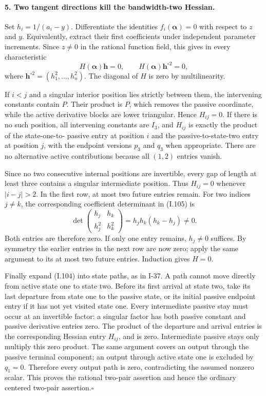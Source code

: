 \paragraph{5. Two tangent directions kill the bandwidth-two Hessian.}
Set $h_i=1/(a_i-y)$. Differentiate the identities
$f_i(\boldsymbol\alpha)=0$ with respect to $z$ and $y$.
Equivalently, extract their first coefficients under independent
parameter increments. Since $z\ne0$ in the rational function
field, this gives in every characteristic
\[
 H(\boldsymbol\alpha)\mathbf h=0,
 \qquad H(\boldsymbol\alpha)\mathbf h^{\circ2}=0,
 \tag{I.105}
\]
where $\mathbf h^{\circ2}=(h_1^2,\ldots,h_n^2)$. The diagonal
of $H$ is zero by multilinearity.

If $i<j$ and a singular interior position lies strictly between
them, the intervening constants contain $P$. Their product
is $P$, which removes the passive coordinate, while the active
derivative blocks are lower triangular. Hence $H_{ij}=0$.
If there is no such position, all intervening constants are
$I_3$, and $H_{ij}$ is exactly the product of the state-one-to-
passive entry at position $i$ and the passive-to-state-two
entry at position $j$, with the endpoint versions $p_3$ and
$q_3$ when appropriate. There are no alternative active
contributions because all $(1,2)$ entries vanish.

Since no two consecutive internal positions are invertible,
every gap of length at least three contains a singular
intermediate position. Thus $H_{ij}=0$ whenever $|i-j|>2$.
In the first row, at most two future entries remain. For two
indices $j\ne k$, the corresponding coefficient determinant
in (I.105) is
\[
 \det\begin{pmatrix}h_j&h_k\\h_j^2&h_k^2\end{pmatrix}
 =h_jh_k(h_k-h_j)\ne0.
 \tag{I.106}
\]
Both entries are therefore zero. If only one entry remains,
$h_j\ne0$ suffices. By symmetry the earlier entries in the
next row are now zero; apply the same argument to its at most
two future entries. Induction gives $H=0$.

Finally expand (I.104) into state paths, as in I-37. A path
cannot move directly from active state one to state two.
Before its first arrival at state two, take its last departure
from state one to the passive state, or its initial passive
endpoint entry if it has not yet visited state one. Every
intermediate passive stay must occur at an invertible factor:
a singular factor has both passive constant and passive
derivative entries zero. The product of the departure and
arrival entries is the corresponding Hessian entry $H_{ij}$,
and is zero. Intermediate passive stays only multiply this
zero product. The same argument covers an output through the
passive terminal component; an output through active state one
is excluded by $q_1=0$. Therefore every output path is zero,
contradicting the assumed nonzero scalar. This proves the
rational two-pair assertion and hence the ordinary centered
two-pair assertion.\hfill$\square$

